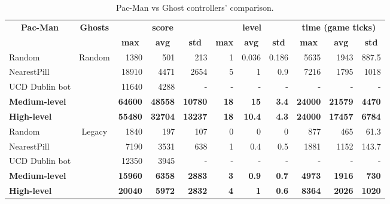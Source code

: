 \begin{table}[]
\centering
\caption{Pac-Man vs Ghost controllers' comparison.}
\label{table:single_obj}
\begin{tabular}{|l|c|r|r|r|r|r|r|r|r|r|}
\hline
\multicolumn{1}{|c|}{\multirow{2}{*}{\textbf{Pac-Man}}} & \multirow{2}{*}{\textbf{Ghosts}} & \multicolumn{3}{c|}{\textbf{score}} & \multicolumn{3}{c|}{\textbf{level}} & \multicolumn{3}{c|}{\textbf{time (game ticks)}} \\ \cline{3-11} 
\multicolumn{1}{|c|}{} &  & \multicolumn{1}{c|}{\textbf{max}} & \multicolumn{1}{c|}{\textbf{avg}} & \multicolumn{1}{c|}{\textbf{std}} & \multicolumn{1}{c|}{\textbf{max}} & \multicolumn{1}{c|}{\textbf{avg}} & \multicolumn{1}{c|}{\textbf{std}} & \multicolumn{1}{c|}{\textbf{max}} & \multicolumn{1}{c|}{\textbf{avg}} & \multicolumn{1}{c|}{\textbf{std}} \\ \hline
Random &  \multirow{5}{*}{Random} & 1380 & 501 & 213 & 1 & 0.036 & 0.186 & 5635 & 1943 & 887.5 \\ \cline{1-1} \cline{3-11} 
NearestPill &  & 18910 & 4471 & 2654 & 5 & 1 & 0.9 & 7216 & 1795 & 1018 \\ \cline{1-1} \cline{3-11} 
UCD Dublin bot\cite{galvan2010evolving} &  & 11640 & 4288 & - & - & - & - & - & - & - \\ \cline{1-1} \cline{3-11} 
\textbf{Medium-level} &  & \textbf{64600} & \textbf{48558} & \textbf{10780} & \textbf{18} & \textbf{15} & \textbf{3.4} & \textbf{24000} & \textbf{21579} & \textbf{4470} \\ \cline{1-1} \cline{3-11} 
\textbf{High-level} &  & \textbf{55480} & \textbf{32704} & \textbf{13237} & \textbf{18} & \textbf{10.4} & \textbf{4.3} & \textbf{24000} & \textbf{17457} & \textbf{6784} \\ \hline
Random & \multirow{5}{*}{Legacy} & 1840 & 197 & 107 & 0 & 0 & 0 & 877 & 465 & 61.3 \\ \cline{1-1} \cline{3-11} 
NearestPill &  & 7190 & 3531 & 638 & 1 & 0.4 & 0.5 & 1881 & 1152 & 143.7 \\ \cline{1-1} \cline{3-11} 
UCD Dublin bot\cite{galvan2010evolving} &  & 12350 & 3945 & - & - & - & - & - & - & - \\ \cline{1-1} \cline{3-11} 
\textbf{Medium-level} &  & \textbf{15960} & \textbf{6358} & \textbf{2883} & \textbf{3} & \textbf{0.9} & \textbf{0.7} & \textbf{4973} & \textbf{1916} & \textbf{730} \\ \cline{1-1} \cline{3-11} 
\textbf{High-level} &  & \textbf{20040} & \textbf{5972} & \textbf{2832} & \textbf{4} & \textbf{1} & \textbf{0.6} & \textbf{8364} & \textbf{2026} & \textbf{1020} \\ \hline
\end{tabular}
\end{table}

